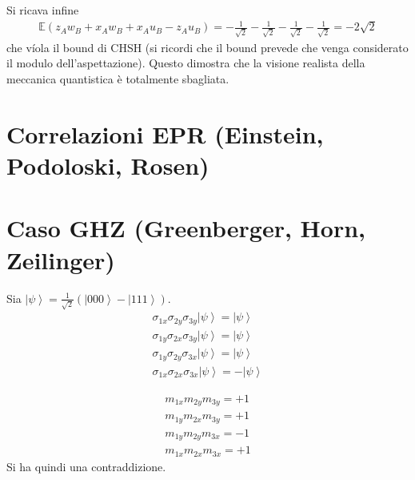 Si ricava infine
\begin{equation}\begin{split}
\mathbb{E}\left(z_Aw_B+x_Aw_B+x_Au_B-z_Au_B\right)=-\frac{1}{\sqrt{2}}-\frac{1}{\sqrt{2}}-\frac{1}{\sqrt{2}}-\frac{1}{\sqrt{2}}=-2\sqrt{2}
\end{split}\end{equation}
che víola il bound di CHSH (si ricordi che il bound prevede che venga considerato il modulo dell'aspettazione). Questo dimostra che la visione realista della meccanica quantistica è totalmente sbagliata.

\section{Correlazioni EPR (Einstein, Podoloski, Rosen)} %


\section{Caso GHZ (Greenberger, Horn, Zeilinger)} %
Sia $\left |\psi  \right\rangle=\frac{1}{\sqrt{2}}\left(\left |000 \right\rangle-\left |111 \right\rangle\right)$.
\begin{equation}\begin{split}
\sigma_{1x}\sigma_{2y}\sigma_{3y}\left |\psi  \right\rangle=\left |\psi  \right\rangle \\
\sigma_{1y}\sigma_{2x}\sigma_{3y}\left |\psi  \right\rangle=\left |\psi  \right\rangle \\
\sigma_{1y}\sigma_{2y}\sigma_{3x}\left |\psi  \right\rangle=\left |\psi  \right\rangle \\
\sigma_{1x}\sigma_{2x}\sigma_{3x}\left |\psi  \right\rangle=-\left |\psi  \right\rangle
\end{split}\end{equation}

\begin{equation}\begin{split}
m_{1x}m_{2y}m_{3y}=+1 \\
m_{1y}m_{2x}m_{3y}=+1 \\
m_{1y}m_{2y}m_{3x}=-1 \\
m_{1x}m_{2x}m_{3x}=+1
\end{split}\end{equation}
Si ha quindi una contraddizione.

